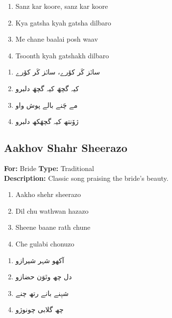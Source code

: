 \documentclass[12pt]{article}
\newcommand{\bigroman}[1]{\fontsize{16pt}{18pt}\selectfont\RaggedRight #1}
\newcommand{\bigarabic}[1]{\fontsize{16pt}{18pt}\selectfont \textarabic{#1}}
\begin{document}
\begin{multicols}{2}
\begin{enumerate}[leftmargin=*, label=\arabic*., font=\fontsize{16pt}{18pt}\selectfont]
  \item \bigroman{Sanz kar koore, sanz kar koore}
  \item \bigroman{Kya gatsha kyah gatsha dilbaro}
  \item \bigroman{Me chane baalai posh waav}
  \item \bigroman{Tsoonth kyah gatshakh dilbaro}
\end{enumerate}

\columnbreak

\begin{RTL}
\begin{enumerate}[leftmargin=*, label=\arabic*., font=\fontsize{16pt}{18pt}\selectfont]
  \item \bigarabic{سانٛز کَر کۆرے، سانٛز کَر کۆرے}
  \item \bigarabic{کیہ گچھَ کیہ گچھَ دلبرو}
  \item \bigarabic{مے چَنے بالے پوش واو}
  \item \bigarabic{ژۆنتھ کیہ گچھَکھ دلبرو}
\end{enumerate}
\end{RTL}
\end{multicols}

\subsection*{Aakhov Shahr Sheerazo}
\textbf{For:} Bride \quad \textbf{Type:} Traditional\\
\textbf{Description:} Classic song praising the bride's beauty.

\begin{multicols}{2}
\begin{enumerate}[leftmargin=*, label=\arabic*., font=\fontsize{16pt}{18pt}\selectfont]
  \item \bigroman{Aakho shehr sheerazo}
  \item \bigroman{Dil chu wathwan hazazo}
  \item \bigroman{Sheene baane rath chune}
  \item \bigroman{Che gulabi chonuzo}
\end{enumerate}

\columnbreak

\begin{RTL}
\begin{enumerate}[leftmargin=*, label=\arabic*., font=\fontsize{16pt}{18pt}\selectfont]
  \item \bigarabic{آکھو شہر شیرازو}
  \item \bigarabic{دل چھ وٿوَن حضازو}
  \item \bigarabic{شیٖنے بانے رتھ چنے}
  \item \bigarabic{چھ گلابی چونوژو}
\end{enumerate}
\end{RTL}
\end{multicols}
\end{document}
